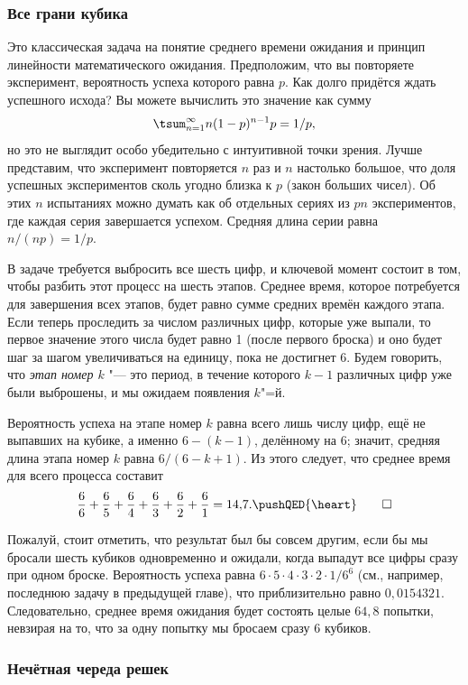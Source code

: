 \documentclass[twoside]{book}
\begin{document}
\subsubsection*{Все грани кубика}%

Это классическая задача на понятие среднего времени ожидания и принцип
линейности математического ожидания.
Предположим, что вы повторяете
эксперимент, вероятность успеха которого равна $p$.
Как долго
придётся ждать успешного исхода? Вы можете вычислить это значение как
сумму
\[\tsum_{n=1}^\infty n(1-p)^{n-1}p=1/p,\]
но это не выглядит особо убедительно с интуитивной точки зрения.
Лучше представим, что эксперимент повторяется $n$ раз и $n$ настолько большое, что доля успешных экспериментов сколь угодно близка к $p$ (закон больших чисел).
Об этих $n$ испытаниях можно думать как об отдельных сериях из $pn$
экспериментов, где каждая серия завершается успехом.
Средняя длина серии равна $n/(np)=1/p$.

В задаче требуется выбросить все шесть цифр, и ключевой момент состоит
в том, чтобы разбить этот процесс на шесть этапов.
Среднее время,
которое потребуется для завершения всех этапов, будет равно сумме
средних времён каждого этапа.
Если теперь проследить за числом
различных цифр, которые уже выпали, то первое значение этого числа
будет равно 1 (после первого броска) и оно будет шаг за шагом
увеличиваться на единицу, пока не достигнет 6.
Будем говорить, что
\emph{этап номер $k$} "--- это период, в течение которого $k-1$
различных цифр уже были выброшены, и мы ожидаем появления $k$"=й.

Вероятность успеха на этапе номер $k$ равна всего лишь числу цифр, ещё не выпавших на кубике, а именно $6-(k-1)$, делённому на $6$;
значит, средняя длина этапа номер $k$ равна $6/(6-k+1)$.
Из этого следует, что среднее время для всего процесса составит
\[\frac66+\frac65+\frac64+\frac63+\frac62+\frac61=14{,}7.
\pushQED{\heart}\qedhere
\]


Пожалуй, стоит отметить, что результат был бы совсем другим, если бы мы бросали шесть кубиков одновременно и ожидали, когда выпадут все цифры сразу при одном броске.
Вероятность успеха равна $6\cdot 5\cdot 4\cdot 3\cdot 2\cdot 1/6^6$ (см., например, последнюю задачу в предыдущей главе), что приблизительно равно $0{,}0154321$.
Следовательно, среднее время ожидания будет состоять целые $64{,}8$
попытки, невзирая на то, что за одну попытку мы бросаем сразу 6 кубиков.

\subsubsection*{Нечётная череда решек}%
\end{document}
